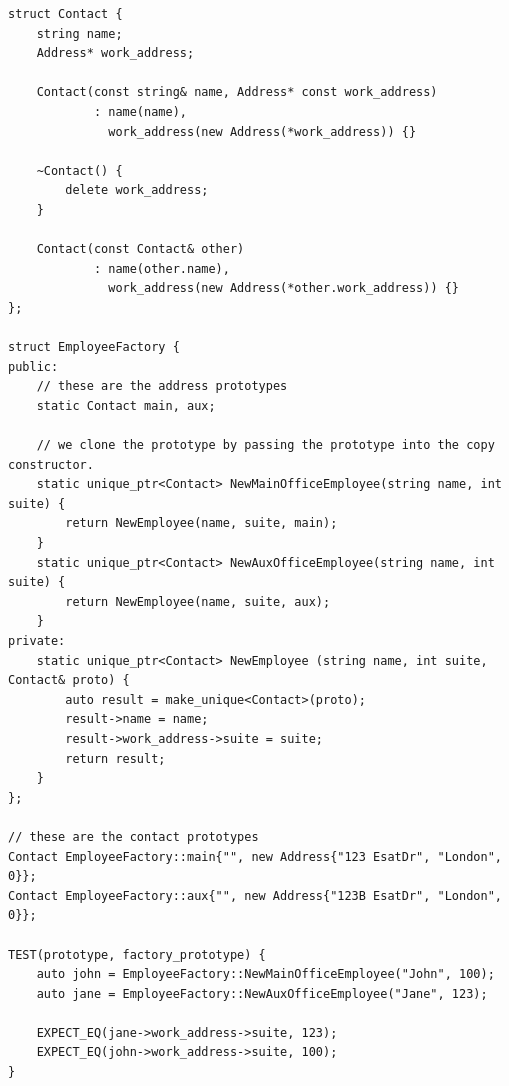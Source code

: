 \documentclass[11pt]{article}
\begin{document}
\begin{itemize}
\begin{multicols}{2}
\begin{lstlisting}
struct Contact {
    string name;
    Address* work_address;

    Contact(const string& name, Address* const work_address)
            : name(name),
              work_address(new Address(*work_address)) {}

    ~Contact() {
        delete work_address;
    }

    Contact(const Contact& other)
            : name(other.name),
              work_address(new Address(*other.work_address)) {}
};

struct EmployeeFactory {
public:
    // these are the address prototypes
    static Contact main, aux;

    // we clone the prototype by passing the prototype into the copy constructor.
    static unique_ptr<Contact> NewMainOfficeEmployee(string name, int suite) {
        return NewEmployee(name, suite, main);
    }
    static unique_ptr<Contact> NewAuxOfficeEmployee(string name, int suite) {
        return NewEmployee(name, suite, aux);
    }
private:
    static unique_ptr<Contact> NewEmployee (string name, int suite, Contact& proto) {
        auto result = make_unique<Contact>(proto);
        result->name = name;
        result->work_address->suite = suite;
        return result;
    }
};

// these are the contact prototypes
Contact EmployeeFactory::main{"", new Address{"123 EsatDr", "London", 0}};
Contact EmployeeFactory::aux{"", new Address{"123B EsatDr", "London", 0}};

TEST(prototype, factory_prototype) {
    auto john = EmployeeFactory::NewMainOfficeEmployee("John", 100);
    auto jane = EmployeeFactory::NewAuxOfficeEmployee("Jane", 123);

    EXPECT_EQ(jane->work_address->suite, 123);
    EXPECT_EQ(john->work_address->suite, 100);
}
            \end{lstlisting}
        \end{multicols}
    \end{itemize}
\end{document}
